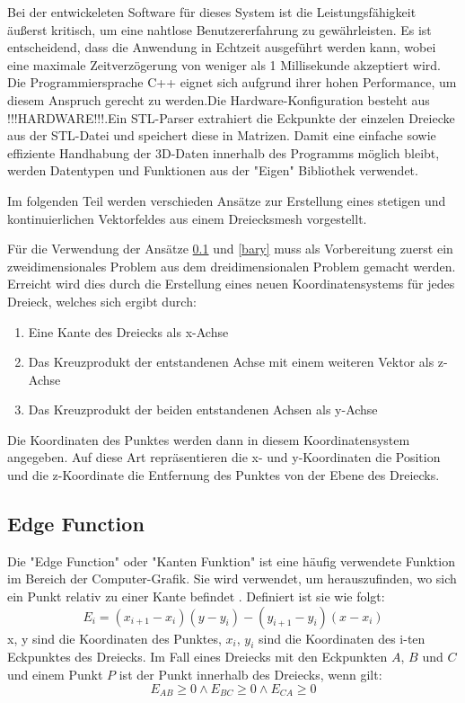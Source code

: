 \documentclass[conference]{IEEEtran}
\begin{document}
Bei der entwickeleten Software für dieses System ist die Leistungsfähigkeit äußerst kritisch, um eine nahtlose Benutzererfahrung zu gewährleisten. Es ist entscheidend, dass die Anwendung in Echtzeit ausgeführt werden kann, wobei eine maximale Zeitverzögerung von weniger als 1 Millisekunde akzeptiert wird. Die Programmiersprache C++ eignet sich aufgrund ihrer hohen Performance, um diesem Anspruch gerecht zu werden.Die Hardware-Konfiguration besteht aus !!!HARDWARE!!!.Ein STL-Parser extrahiert die Eckpunkte der einzelen Dreiecke aus der STL-Datei und speichert diese in Matrizen. Damit eine einfache sowie effiziente Handhabung der 3D-Daten innerhalb des Programms möglich bleibt, werden Datentypen und Funktionen aus der "Eigen" Bibliothek verwendet. 

Im folgenden Teil werden verschieden Ansätze zur Erstellung eines stetigen und kontinuierlichen Vektorfeldes aus einem Dreiecksmesh vorgestellt. 

Für die Verwendung der Ansätze \ref*{edge} und \ref*{bary} muss als Vorbereitung zuerst ein zweidimensionales Problem aus dem dreidimensionalen Problem gemacht werden. Erreicht wird dies durch die Erstellung eines neuen Koordinatensystems für jedes Dreieck, welches sich ergibt durch:
\begin{enumerate}
    \item Eine Kante des Dreiecks als x-Achse
    \item Das Kreuzprodukt der entstandenen Achse mit einem weiteren Vektor als z-Achse
    \item Das Kreuzprodukt der beiden entstandenen Achsen als y-Achse
\end{enumerate}
Die Koordinaten des Punktes werden dann in diesem Koordinatensystem angegeben. Auf diese Art repräsentieren die x- und y-Koordinaten die Position und die z-Koordinate die Entfernung des Punktes von der Ebene des Dreiecks. 

\subsection{Edge Function}\label{edge}
Die "Edge Function" oder "Kanten Funktion" ist eine häufig verwendete Funktion im Bereich der Computer-Grafik. Sie wird verwendet, um herauszufinden, wo sich ein Punkt relativ zu einer Kante befindet \autocite{pinedaParallelAlgorithmPolygon1988}. Definiert ist sie wie folgt:
\begin{equation}
    E_{i} = (x_{i+1} - x_{i})(y - y_{i}) - (y_{i+1} - y_{i})(x - x_{i})
\end{equation}
x, y sind die Koordinaten des Punktes, $x_{i}$, $y_{i}$ sind die Koordinaten des i-ten Eckpunktes des Dreiecks. Im Fall eines Dreiecks mit den Eckpunkten $A$, $B$ und $C$ und einem Punkt $P$ ist der Punkt innerhalb des Dreiecks, wenn gilt:
\begin{equation}
    E_{AB} \geq 0 \land E_{BC} \geq 0 \land E_{CA} \geq 0
\end{equation}
\end{document}
